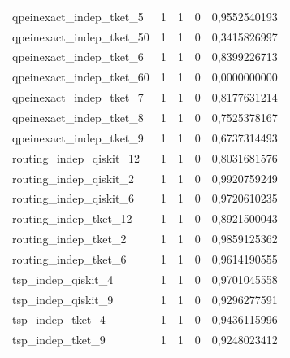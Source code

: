 \begin{longtable}{lrrrr}
qpeinexact\_indep\_tket\_5 & 1 & 1 & 0 & 0,9552540193 \\
qpeinexact\_indep\_tket\_50 & 1 & 1 & 0 & 0,3415826997 \\
qpeinexact\_indep\_tket\_6 & 1 & 1 & 0 & 0,8399226713 \\
qpeinexact\_indep\_tket\_60 & 1 & 1 & 0 & 0,0000000000 \\
qpeinexact\_indep\_tket\_7 & 1 & 1 & 0 & 0,8177631214 \\
qpeinexact\_indep\_tket\_8 & 1 & 1 & 0 & 0,7525378167 \\
qpeinexact\_indep\_tket\_9 & 1 & 1 & 0 & 0,6737314493 \\
routing\_indep\_qiskit\_12 & 1 & 1 & 0 & 0,8031681576 \\
routing\_indep\_qiskit\_2 & 1 & 1 & 0 & 0,9920759249 \\
routing\_indep\_qiskit\_6 & 1 & 1 & 0 & 0,9720610235 \\
routing\_indep\_tket\_12 & 1 & 1 & 0 & 0,8921500043 \\
routing\_indep\_tket\_2 & 1 & 1 & 0 & 0,9859125362 \\
routing\_indep\_tket\_6 & 1 & 1 & 0 & 0,9614190555 \\
tsp\_indep\_qiskit\_4 & 1 & 1 & 0 & 0,9701045558 \\
tsp\_indep\_qiskit\_9 & 1 & 1 & 0 & 0,9296277591 \\
tsp\_indep\_tket\_4 & 1 & 1 & 0 & 0,9436115996 \\
tsp\_indep\_tket\_9 & 1 & 1 & 0 & 0,9248023412 \\
\end{longtable}
\endgroup

